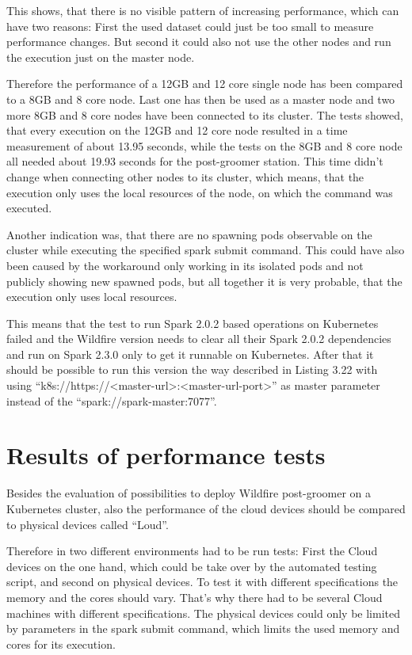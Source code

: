 This shows, that there is no visible pattern of increasing performance, which can have two reasons: First the used dataset could just be too small to measure performance changes. But second it could also not use the other nodes and run the execution just on the master node.

Therefore the performance of a 12GB and 12 core single node has been compared to a 8GB and 8 core node. Last one has then be used as a master node and two more 8GB and 8 core nodes have been connected to its cluster. The tests showed, that every execution on the 12GB and 12 core node resulted in a time measurement of about 13.95 seconds, while the tests on the 8GB and 8 core node all needed about 19.93 seconds for the post-groomer station. This time didn't change when connecting other nodes to its cluster, which means, that the execution only uses the local resources of the node, on which the command was executed.

Another indication was, that there are no spawning pods observable on the cluster while executing the specified spark submit command. This could have also been caused by the workaround only working in its isolated pods and not publicly showing new spawned pods, but all together it is very probable, that the execution only uses local resources.

This means that the test to run Spark 2.0.2 based operations on Kubernetes failed and the Wildfire version needs to clear all their Spark 2.0.2 dependencies and run on Spark 2.3.0 only to get it runnable on Kubernetes. After that it should be possible to run this version the way described in Listing 3.22 with using ``k8s://https://<master-url>:<master-url-port>'' as master parameter instead of the ``spark://spark-master:7077''.

\section{Results of performance tests}

Besides the evaluation of possibilities to deploy Wildfire post-groomer on a Kubernetes cluster, also the performance of the cloud devices should be compared to physical devices called ``Loud''.

Therefore in two different environments had to be run tests: First the Cloud devices on the one hand, which could be take over by the automated testing script, and second on physical devices. To test it with different specifications the memory and the cores should vary. That's why there had to be several Cloud machines with different specifications. The physical devices could only be limited by parameters in the spark submit command, which limits the used memory and cores for its execution.

